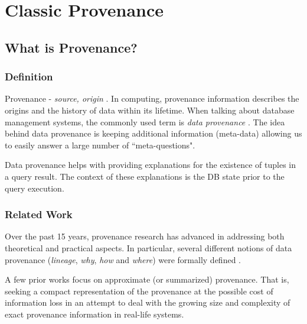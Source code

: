 \chapter{Classic Provenance}
\label{chap:classic_provenance}

\section{What is Provenance?}

\subsection{Definition}
Provenance - \textit{source, origin} \cite{prov_dict}. 
In computing, provenance information describes the origins and the history of data within its lifetime. When talking about database management systems, the commonly used term is \textit{data provenance} \cite{cheney2009provenance}. The idea behind data provenance is keeping additional information (meta-data) allowing us to easily answer a large number of ``meta-questions".
\par Data provenance helps with providing explanations for the existence of tuples in a query result. The context of these explanations is the DB state prior to the query execution. \\

\subsection{Related Work} Over the past 15 years, provenance research has advanced in addressing both theoretical \cite{cheney2009provenance, green2007provenance, Deutch2014} 
and practical \cite{Ives2008, Karvounarakis2010, Deutch2015, Deutch2017, Senellart2018, DBLP:conf/cidr/IvesZHZ19} 
aspects. 
In particular, several different notions of data provenance (\textit{lineage}, \textit{why}, \textit{how} and \textit{where}) were formally defined \cite{Cui:2000:TLV:357775.357777, DBLP:conf/icdt/BunemanKT01,  cheney2009provenance}.
\par A few prior works \cite{approx_lineage, approx_PROX, approx_summary, approx_why_and_why_not} focus on approximate (or summarized) provenance. That is, seeking a compact representation of the provenance at the possible cost of information loss in an attempt to deal with the growing size and complexity of exact provenance information in real-life systems.


